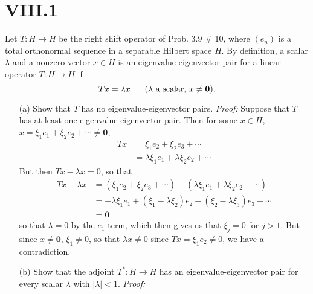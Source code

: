 \documentclass{article}
\begin{document}
\section*{VIII.1}
Let $T : H \to H$ be the right shift operator of Prob. 3.9 \# 10, where $(e_n)$ is a total orthonormal sequence in a separable Hilbert space $H$. By definition, a scalar $\lambda$ and a nonzero vector $x \in H$ is an eigenvalue-eigenvector pair for a linear operator $T : H \to H$ if 
\[Tx = \lambda x \hspace{0.6cm} (\lambda \text{ a scalar, } x \neq \mathbf{0}).\]
\begin{itemize}
    \item[(a)] Show that $T$ has no eigenvalue-eigenvector pairs.
    \newline\newline
    \textit{Proof:} Suppose that $T$ has at least one eigenvalue-eigenvector pair. Then for some $x \in H$, $x = \xi_1e_1 + \xi_2e_2 + \cdots \neq \mathbf{0}$, 
    \begin{align*}
        Tx &= \xi_1e_2 + \xi_2e_3 + \cdots\\
        &= \lambda\xi_1e_1 + \lambda\xi_2e_2 + \cdots
    \end{align*}
    But then $Tx - \lambda x = 0$, so that
    \begin{align*}
        Tx - \lambda x &= (\xi_1e_2 + \xi_2e_3 + \cdots) - (\lambda\xi_1e_1 + \lambda\xi_2e_2 + \cdots)\\
        &= -\lambda\xi_1e_1 + (\xi_1 - \lambda\xi_2)e_2 + (\xi_2 - \lambda\xi_3)e_3 + \cdots\\
        &= \mathbf{0}
    \end{align*}
    so that $\lambda = 0$ by the $e_1$ term, which then gives us that $\xi_j = 0$ for $j > 1$. But since $x \neq \mathbf{0}$, $\xi_1 \neq 0$, so that $\lambda x \neq 0$ since $Tx = \xi_1e_2 \neq 0$, we have a contradiction. 

    \item[(b)] Show that the adjoint $T^*: H \to H$ has an eigenvalue-eigenvector pair for every scalar $\lambda$ with $|\lambda| < 1$.
    \newline\newline
    \textit{Proof:}
    
\end{itemize}
\end{document}
